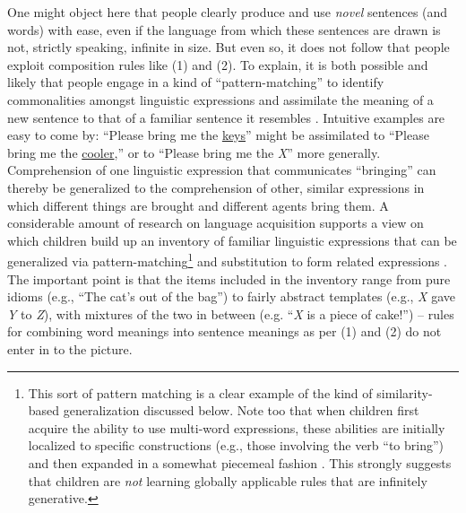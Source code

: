 One might object here that people clearly produce and use \textit{novel} sentences (and words) with ease, even if the language from which these sentences are drawn is not, strictly speaking, infinite in size. But even so, it does not follow that people exploit composition rules like (1) and (2). To explain, it is both possible and likely that people engage in a kind of ``pattern-matching'' to identify commonalities amongst linguistic expressions and assimilate the meaning of a new sentence to that of a familiar sentence it resembles \citep{Tomasello:2003}. Intuitive examples are easy to come by: ``Please bring me the \underline{keys}'' might be assimilated to ``Please bring me the \underline{cooler},'' or to ``Please bring me the \textit{X}'' more generally. Comprehension of one linguistic expression that communicates ``bringing'' can thereby be generalized to the comprehension of other, similar expressions in which different things are brought and different agents bring them. A considerable amount of research on language acquisition supports a view on which children build up an inventory of familiar linguistic expressions that can be generalized via pattern-matching\footnote{This sort of pattern matching is a clear example of the kind of similarity-based generalization discussed below. Note too that when children first acquire the ability to use multi-word expressions, these abilities are initially localized to specific constructions (e.g., those involving the verb ``to bring'') and then expanded in a somewhat piecemeal fashion \citep{Tomasello:2003,Tomasello:2005}. This strongly suggests that children are \textit{not} learning globally applicable rules that are infinitely generative.} and substitution to form related expressions \citep{Tomasello:2003}. The important point is that the items included in the inventory range from pure idioms (e.g., ``The cat's out of the bag'') to fairly abstract templates (e.g., \textit{X} gave \textit{Y} to \textit{Z}), with mixtures of the two in between (e.g. ``\textit{X} is a piece of cake!'') -- rules for combining word meanings into sentence meanings as per (1) and (2) do not enter in to the picture. 

